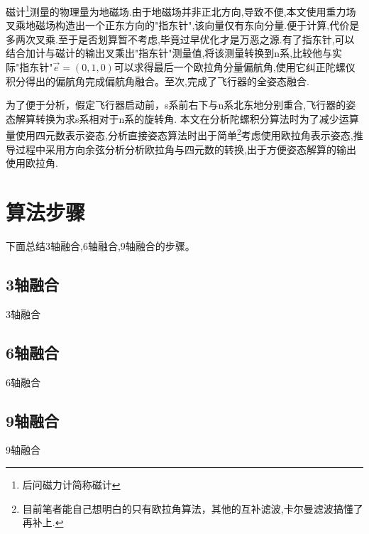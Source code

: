 \documentclass[10pt,a4paper]{article}
\begin{document}
磁计\footnote{后问磁力计简称磁计}测量的物理量为地磁场.由于地磁场并非正北方向,导致不便,本文使用重力场叉乘地磁场构造出一个正东方向的"指东针",该向量仅有东向分量.便于计算,代价是多两次叉乘.至于是否划算暂不考虑,毕竟过早优化才是万恶之源.有了指东针,可以结合加计与磁计的输出叉乘出"指东针"测量值,将该测量转换到n系,比较他与实际"指东针"$\vec{e}=(0,1,0)$可以求得最后一个欧拉角分量偏航角,使用它纠正陀螺仪积分得出的偏航角完成偏航角融合。至次,完成了飞行器的全姿态融合.

为了便于分析，假定飞行器启动前，s系前右下与n系北东地分别重合,飞行器的姿态解算转换为求s系相对于n系的旋转角. 本文在分析陀螺积分算法时为了减少运算量使用四元数表示姿态,分析直接姿态算法时出于简单\footnote{目前笔者能自己想明白的只有欧拉角算法，其他的互补滤波,卡尔曼滤波搞懂了再补上.}考虑使用欧拉角表示姿态,推导过程中采用方向余弦分析分析欧拉角与四元数的转换,出于方便姿态解算的输出使用欧拉角.


\section{算法步骤}\label{section:最终结论}
下面总结3轴融合,6轴融合,9轴融合的步骤。
\subsection{3轴融合}
3轴融合

\subsection{6轴融合}
6轴融合

\subsection{9轴融合}
9轴融合


\newpage
\renewcommand\refname{参考文献}
\centering %


\end{document}
